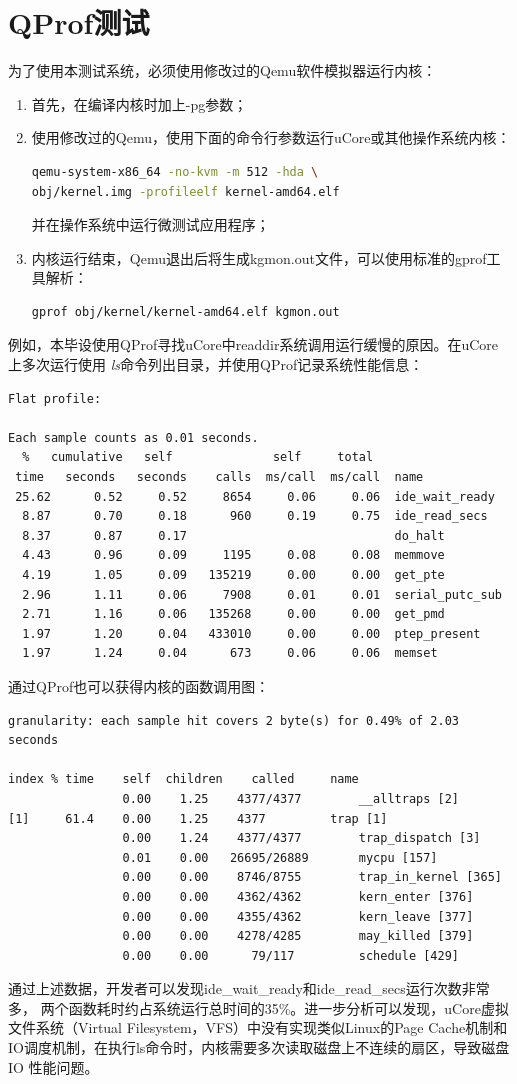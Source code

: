 \section{QProf测试}
为了使用本测试系统，必须使用修改过的Qemu软件模拟器运行内核：
\begin{enumerate}
	\item 首先，在编译内核时加上-pg参数；
	\item
		使用修改过的Qemu，使用下面的命令行参数运行uCore或其他操作系统内核：
		\begin{lstlisting}[language=sh]
qemu-system-x86_64 -no-kvm -m 512 -hda \
obj/kernel.img -profileelf kernel-amd64.elf
\end{lstlisting}

		并在操作系统中运行微测试应用程序；
	\item
		内核运行结束，Qemu退出后将生成kgmon.out文件，可以使用标准的gprof工具解析：
		\begin{lstlisting}[language=sh]
gprof obj/kernel/kernel-amd64.elf kgmon.out
\end{lstlisting}

\end{enumerate}

	例如，本毕设使用QProf寻找uCore中readdir系统调用运行缓慢的原因。在uCore上多次运行使用
	\emph{ls}命令列出目录，并使用QProf记录系统性能信息：
	{\tiny
	\begin{Verbatim}[frame=single]
Flat profile:

Each sample counts as 0.01 seconds.
  %   cumulative   self              self     total
 time   seconds   seconds    calls  ms/call  ms/call  name
 25.62      0.52     0.52     8654     0.06     0.06  ide_wait_ready
  8.87      0.70     0.18      960     0.19     0.75  ide_read_secs
  8.37      0.87     0.17                             do_halt
  4.43      0.96     0.09     1195     0.08     0.08  memmove
  4.19      1.05     0.09   135219     0.00     0.00  get_pte
  2.96      1.11     0.06     7908     0.01     0.01  serial_putc_sub
  2.71      1.16     0.06   135268     0.00     0.00  get_pmd
  1.97      1.20     0.04   433010     0.00     0.00  ptep_present
  1.97      1.24     0.04      673     0.06     0.06  memset
	\end{Verbatim}
	}

	通过QProf也可以获得内核的函数调用图：

	{\tiny
	\begin{Verbatim}[frame=single]
granularity: each sample hit covers 2 byte(s) for 0.49% of 2.03 seconds

index % time    self  children    called     name
                0.00    1.25    4377/4377        __alltraps [2]
[1]     61.4    0.00    1.25    4377         trap [1]
                0.00    1.24    4377/4377        trap_dispatch [3]
                0.01    0.00   26695/26889       mycpu [157]
                0.00    0.00    8746/8755        trap_in_kernel [365]
                0.00    0.00    4362/4362        kern_enter [376]
                0.00    0.00    4355/4362        kern_leave [377]
                0.00    0.00    4278/4285        may_killed [379]
                0.00    0.00      79/117         schedule [429]
	\end{Verbatim}
	}

	通过上述数据，开发者可以发现ide\_wait\_ready和ide\_read\_secs运行次数非常多，
两个函数耗时约占系统运行总时间的35\%。进一步分析可以发现，uCore虚拟文件系统（Virtual
Filesystem，VFS）中没有实现类似Linux的Page
Cache机制和IO调度机制，在执行ls命令时，内核需要多次读取磁盘上不连续的扇区，导致磁盘IO
性能问题。


